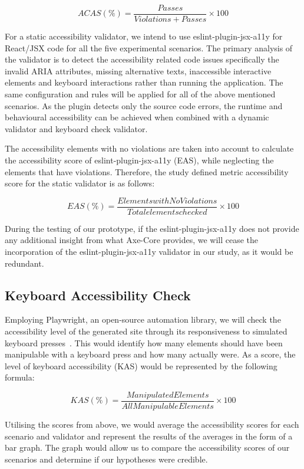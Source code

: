 \documentclass[conference]{IEEEtran}
\begin{document}
\[ ACAS (\%) = \frac{Passes} {Violations + Passes} \times 100 \]

For a static accessibility validator, we intend to use eslint-plugin-jsx-a11y for React/JSX code for all the five experimental scenarios.
The primary analysis of the validator is to detect the accessibility related code issues specifically the invalid ARIA attributes, missing 
alternative texts, inaccessible interactive elements and keyboard interactions rather than running the application. The same configuration and
rules will be applied for all of the above mentioned scenarios. As the plugin detects only the source code errors, the runtime and behavioural
accessibility can be achieved when combined with a dynamic validator and keyboard check validator.

The accessibility elements with no violations are taken into account to calculate the accessibility score of eslint-plugin-jsx-a11y (EAS), while neglecting
the elements that have violations. Therefore, the study defined metric accessibility score for the static validator is as follows:

\[EAS (\%) = \frac{Elements with No Violations}{Total elements checked} \times 100 \]

During the testing of our prototype, if the eslint-plugin-jsx-a11y does not provide any additional insight from what 
Axe-Core provides, we will cease the incorporation of the eslint-plugin-jsx-a11y validator in our study, 
as it would be redundant.

\subsection{Keyboard Accessibility Check}
Employing Playwright, an open-source automation library, we will check the accessibility
level of the generated site through its responsiveness to simulated keyboard presses~\cite{microsoft2026playwright}. This would
identify how many elements should have been manipulable with a keyboard press and how many actually were. As a score, 
the level of keyboard accessibility (KAS) would be represented by the following formula:

\[KAS (\%) = \frac{Manipulated Elements}{All Manipulable Elements} \times 100 \]

Utilising the scores from above, we would average the accessibility scores for each scenario and validator and represent the results of 
the averages in the form of a bar graph. The graph would allow us to compare the accessibility scores of our scenarios
and determine if our hypotheses were credible.  
\end{document}
